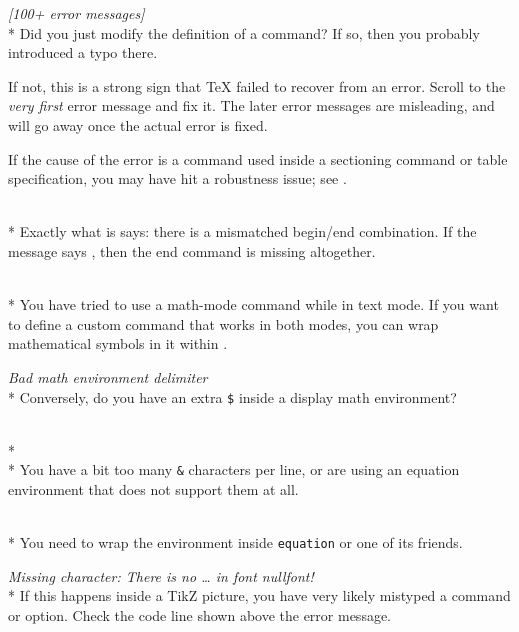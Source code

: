 \medskip\noindent\emph{[100+ error messages]}\\*
Did you just modify the definition of a command?
If so, then you probably introduced a typo there.

If not, this is a strong sign that \TeX{} failed to recover from an error.
Scroll to the \emph{very first} error message and fix it.
The later error messages are misleading,
and will go away once the actual error is fixed.

If the cause of the error is a command used inside a sectioning command or table specification,
you may have hit a robustness issue; see .

\medskip{}\\*
Exactly what is says: there is a mismatched begin/end combination.
If the message says \verb||, then the end command is missing altogether.

\medskip{}\\*
You have tried to use a math-mode command while in text mode.
If you want to define a custom command that works in both modes,
you can wrap mathematical symbols in it within .

\medskip\noindent\emph{Bad math environment delimiter}\\*
Conversely, do you have an extra \verb|$| inside a display math environment?

\medskip{}\\*
\medskip{}\\*
You have a bit too many \verb|&| characters per line,
or are using an equation environment that does not support them at all.

\medskip{}\\*
You need to wrap the environment inside \verb|equation| or one of its friends.

\medskip\noindent\emph{Missing character: There is no \emph{\dots} in font nullfont!}\\*
If this happens inside a TikZ picture, you have very likely mistyped a command or option.
Check the code line shown above the error message.


